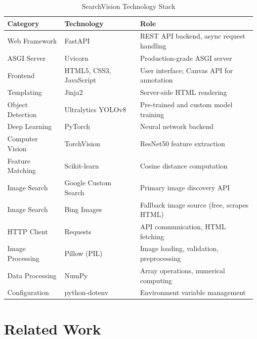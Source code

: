 \documentclass[12pt, letterpaper]{article}
\begin{document}
\begin{table}[H]
  \centering
  \caption{SearchVision Technology Stack}
  \begin{tabularx}{\linewidth}{@{} l l X @{}}
    \toprule
    \textbf{Category}  & \textbf{Technology}     & \textbf{Role} \\
    \midrule
    Web Framework      & FastAPI                 & REST API backend, async request handling \\
    ASGI Server        & Uvicorn                 & Production-grade ASGI server \\
    Frontend           & HTML5, CSS3, JavaScript & User interface; Canvas API for annotation \\
    Templating         & Jinja2                  & Server-side HTML rendering \\
    Object Detection   & Ultralytics YOLOv8      & Pre-trained and custom model training \\
    Deep Learning      & PyTorch                 & Neural network backend \\
    Computer Vision    & TorchVision             & ResNet50 feature extraction \\
    Feature Matching   & Scikit-learn            & Cosine distance computation \\
    Image Search       & Google Custom Search    & Primary image discovery API \\
    Image Search       & Bing Images             & Fallback image source (free, scrapes HTML) \\
    HTTP Client        & Requests                & API communication, HTML fetching \\
    Image Processing   & Pillow (PIL)            & Image loading, validation, preprocessing \\
    Data Processing    & NumPy                   & Array operations, numerical computing \\
    Configuration      & python-dotenv           & Environment variable management \\
    \bottomrule
  \end{tabularx}
\end{table}


\section{Related Work}
\end{document}
